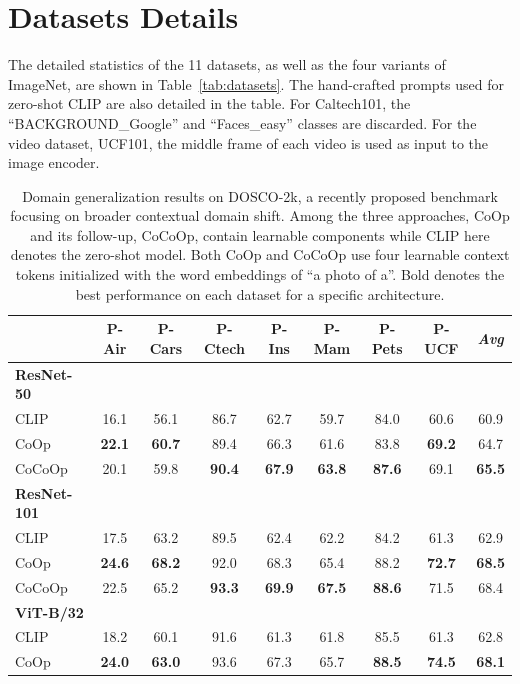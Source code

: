 \section{Datasets Details} \label{appx:datasets_details}
The detailed statistics of the 11 datasets, as well as the four variants of ImageNet, are shown in Table~\ref{tab:datasets}. The hand-crafted prompts used for zero-shot CLIP are also detailed in the table. For Caltech101, the ``BACKGROUND\_Google'' and ``Faces\_easy'' classes are discarded. For the video dataset, UCF101, the middle frame of each video is used as input to the image encoder.

\begin{table}[t]
    \tabstyle{9pt}
    \caption{Domain generalization results on DOSCO-2k, a recently proposed benchmark focusing on broader contextual domain shift. Among the three approaches, CoOp and its follow-up, CoCoOp, contain learnable components while CLIP here denotes the zero-shot model. Both CoOp and CoCoOp use four learnable context tokens initialized with the word embeddings of ``a photo of a''. Bold denotes the best performance on each dataset for a specific architecture.}
    \label{tab:dosco_2k}
    \begin{tabular}{l cccccccc}
    \toprule
    & P-Air & P-Cars & P-Ctech & P-Ins & P-Mam & P-Pets & P-UCF & \textit{Avg} \\
    \midrule
    \textbf{ResNet-50} & \\
    CLIP & 16.1 & 56.1 & 86.7 & 62.7 & 59.7 & 84.0 & 60.6 & 60.9 \\
    CoOp & \textbf{22.1} & \textbf{60.7} & 89.4 & 66.3 & 61.6 & 83.8 & \textbf{69.2} & 64.7 \\
    CoCoOp & 20.1 & 59.8 & \textbf{90.4} & \textbf{67.9} & \textbf{63.8} &  \textbf{87.6} & 69.1 & \textbf{65.5} \\
    \midrule
    \textbf{ResNet-101} & \\
    CLIP & 17.5 & 63.2 & 89.5 & 62.4 & 62.2 & 84.2 & 61.3 & 62.9 \\
    CoOp & \textbf{24.6} & \textbf{68.2} & 92.0 & 68.3 & 65.4 & 88.2 & \textbf{72.7} & \textbf{68.5} \\
    CoCoOp & 22.5 & 65.2 & \textbf{93.3} & \textbf{69.9} & \textbf{67.5} & \textbf{88.6} & 71.5 & 68.4 \\
    \midrule
    \textbf{ViT-B/32} & \\
    CLIP & 18.2 & 60.1 & 91.6 & 61.3 & 61.8 & 85.5 & 61.3 & 62.8 \\
    CoOp & \textbf{24.0} & \textbf{63.0} & 93.6 & 67.3 & 65.7 & \textbf{88.5} & \textbf{74.5} & \textbf{68.1} \\

\end{tabular}
\end{table}
